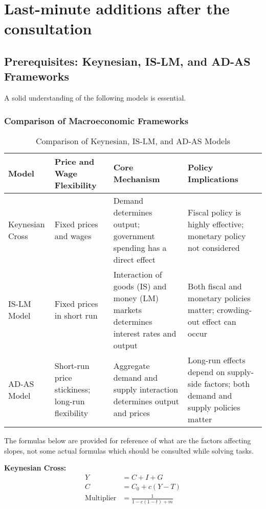 \chapter*{Last-minute additions after the consultation}

\section*{Prerequisites: Keynesian, IS-LM, and AD-AS Frameworks}
A solid understanding of the following models is essential. 

\subsection*{Comparison of Macroeconomic Frameworks}

\begin{table}[ht]
    \centering
    \small
    \begin{tabularx}{\textwidth}{|X|X|X|X|}
    \hline
    \textbf{Model} & \textbf{Price and Wage Flexibility} & \textbf{Core Mechanism} & \textbf{Policy Implications} \\
    \hline
    Keynesian Cross & Fixed prices and wages & Demand determines output; government spending has a direct effect & Fiscal policy is highly effective; monetary policy not considered \\
    \hline
    IS-LM Model & Fixed prices in short run & Interaction of goods (IS) and money (LM) markets determines interest rates and output & Both fiscal and monetary policies matter; crowding-out effect can occur \\
    \hline
    AD-AS Model & Short-run price stickiness; long-run flexibility & Aggregate demand and supply interaction determines output and prices & Long-run effects depend on supply-side factors; both demand and supply policies matter \\
    \hline
    \end{tabularx}
    \caption{Comparison of Keynesian, IS-LM, and AD-AS Models}
\end{table}

\newpage

The formulas below are provided for reference of what are the factors affecting slopes, not some actual formulas which should be consulted while solving tasks.

\textbf{Keynesian Cross:}
\begin{align*}
    Y &= C + I + G \\
    C &= C_0 + c(Y - T) \\
    \text{Multiplier} &= \frac{1}{1 - c (1 - t) + m}
\end{align*}


